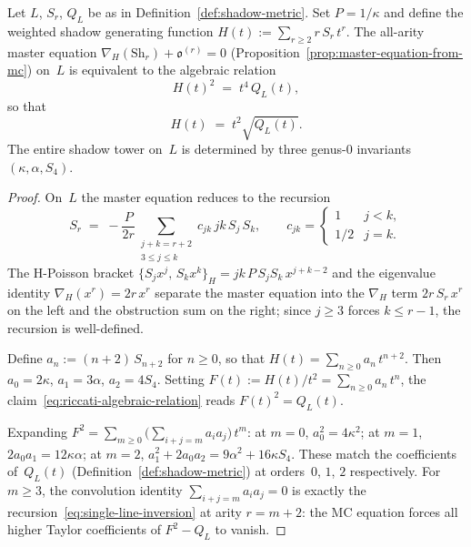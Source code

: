 \begin{theorem}
\label{thm:riccati-algebraicity}
\label{thm:shadow-metric-existence}
\ClaimStatusProvedHere
{}
Let $L$, $S_r$, $Q_L$ be as in
Definition~\textup{\ref{def:shadow-metric}}.
Set $P = 1/\kappa$ and define the weighted shadow
generating function
$H(t) := \sum_{r \geq 2} r\,S_r\,t^r$.
The all-arity master equation
$\nabla_H(\mathrm{Sh}_r) + \mathfrak{o}^{(r)} = 0$
\textup{(}Proposition~\textup{\ref{prop:master-equation-from-mc})}
on~$L$ is equivalent to the algebraic relation
\begin{equation}\label{eq:riccati-algebraic-relation}
  H(t)^2
  \;=\;
  t^4\,Q_L(t),
\end{equation}
so that
\begin{equation}\label{eq:shadow-gf-closed-form}
  H(t)
  \;=\;
  t^2\sqrt{Q_L(t)}.
\end{equation}
The entire shadow tower on~$L$ is determined by three
genus-$0$ invariants $(\kappa, \alpha, S_4)$.
\end{theorem}

\begin{proof}
On~$L$ the master equation reduces to the recursion
\begin{equation}\label{eq:single-line-inversion}
  S_r
  \;=\;
  -\frac{P}{2r}
  \sum_{\substack{j + k = r + 2 \\ 3 \leq j \leq k}}
  c_{jk}\,jk\,S_j\,S_k,
  \qquad
  c_{jk} = \begin{cases} 1 & j < k, \\ 1/2 & j = k.\end{cases}
\end{equation}
The H-Poisson bracket
$\{S_j x^j,\,S_k x^k\}_H = jk\,P\,S_j S_k\,x^{j+k-2}$
and the eigenvalue identity
$\nabla_H(x^r) = 2r\,x^r$ separate the master equation into
the $\nabla_H$ term $2r\,S_r\,x^r$ on the left and the
obstruction sum on the right;
since $j \geq 3$ forces $k \leq r - 1$, the recursion is
well-defined.

Define $a_n := (n+2)\,S_{n+2}$ for $n \geq 0$, so that
$H(t) = \sum_{n \geq 0} a_n\,t^{n+2}$.
Then $a_0 = 2\kappa$, $a_1 = 3\alpha$,
$a_2 = 4S_4$.  Setting $F(t) := H(t)/t^2
= \sum_{n \geq 0} a_n\,t^n$,
the claim~\eqref{eq:riccati-algebraic-relation} reads
$F(t)^2 = Q_L(t)$.

Expanding $F^2 = \sum_{m \geq 0}
\bigl(\sum_{i+j=m} a_i a_j\bigr)\,t^m$:
at $m = 0$, $a_0^2 = 4\kappa^2$;
at $m = 1$, $2a_0 a_1 = 12\kappa\alpha$;
at $m = 2$,
$a_1^2 + 2a_0 a_2 = 9\alpha^2 + 16\kappa S_4$.
These match the coefficients of~$Q_L(t)$
(Definition~\ref{def:shadow-metric}) at
orders~$0$, $1$, $2$ respectively.
For $m \geq 3$, the convolution identity
$\sum_{i+j=m} a_i a_j = 0$ is exactly the
recursion~\eqref{eq:single-line-inversion} at
arity $r = m + 2$: the MC equation forces all
higher Taylor coefficients of $F^2 - Q_L$ to vanish.
\end{proof}

